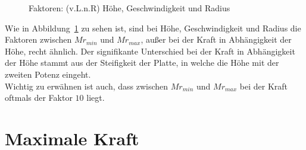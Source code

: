 \begin{figure}[H]%
	\centering
	\qquad
	\caption{Faktoren: (v.L.n.R) Höhe, Geschwindigkeit und Radius}%
	\label{fig:Faktoren}%
\end{figure}

Wie in Abbildung~\ref{fig:Faktoren} zu sehen ist, sind bei Höhe, Geschwindigkeit und Radius die Faktoren zwischen $Mr_{min}$ und $Mr_{max}$, außer bei der Kraft in Abhängigkeit der Höhe, recht ähnlich. Der signifikante Unterschied bei der Kraft in Abhängigkeit der Höhe stammt aus der Steifigkeit der Platte, in welche die Höhe mit der zweiten Potenz eingeht. \\
Wichtig zu erwähnen ist auch, dass zwischen $Mr_{min}$ und $Mr_{max}$ bei der Kraft oftmals der Faktor $10$ liegt.


\section{Maximale Kraft}
\label{sec:Kraft}


